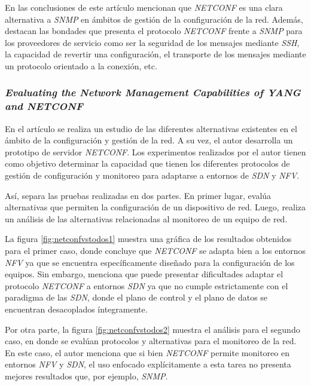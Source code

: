En las conclusiones de este artículo mencionan que \textit{NETCONF} es una clara alternativa a \textit{SNMP} en ámbitos de gestión de la configuración de la red. Además, destacan las bondades que presenta el protocolo \textit{NETCONF} frente a \textit{SNMP} para los proveedores de servicio como ser la seguridad de los mensajes mediante \textit{SSH}, la capacidad de revertir una configuración, el transporte de los mensajes mediante un protocolo orientado a la conexión, etc.



\subsubsection*{\textit{Evaluating the Network Management Capabilities of YANG and NETCONF}}

En el artículo \parencite{netconfvstodos} se realiza un estudio de las diferentes alternativas existentes en el ámbito de la configuración y gestión de la red. A su vez, el autor desarrolla un prototipo de servidor \textit{NETCONF}. Los experimentos realizados por el autor tienen como objetivo determinar la capacidad que tienen los diferentes protocolos de gestión de configuración y monitoreo para adaptarse a entornos de \textit{SDN} y \textit{NFV}. 

Así, separa las pruebas realizadas en dos partes. En primer lugar, evalúa alternativas que permiten la configuración de un dispositivo de red. Luego, realiza un análisis de las alternativas relacionadas al monitoreo de un equipo de red.

La figura \ref{fig:netconfvstodos1} muestra una gráfica de los resultados obtenidos para el primer caso, donde concluye que \textit{NETCONF} se adapta bien a los entornos \textit{NFV} ya que se encuentra específicamente diseñado para la configuración de los equipos. Sin embargo, menciona que puede presentar dificultades adaptar el protocolo \textit{NETCONF} a entornos \textit{SDN} ya que no cumple estrictamente con el paradigma de las \textit{SDN}, donde el plano de control y el plano de datos se encuentran desacoplados íntegramente.

Por otra parte, la figura \ref{fig:netconfvstodos2} muestra el análisis para el segundo caso, en donde se evalúan protocolos y alternativas para el monitoreo de la red. En este caso, el autor menciona que si bien \textit{NETCONF} permite monitoreo en entornos \textit{NFV} y \textit{SDN}, el uso enfocado explícitamente a esta tarea no presenta mejores resultados que, por ejemplo, \textit{SNMP}.


